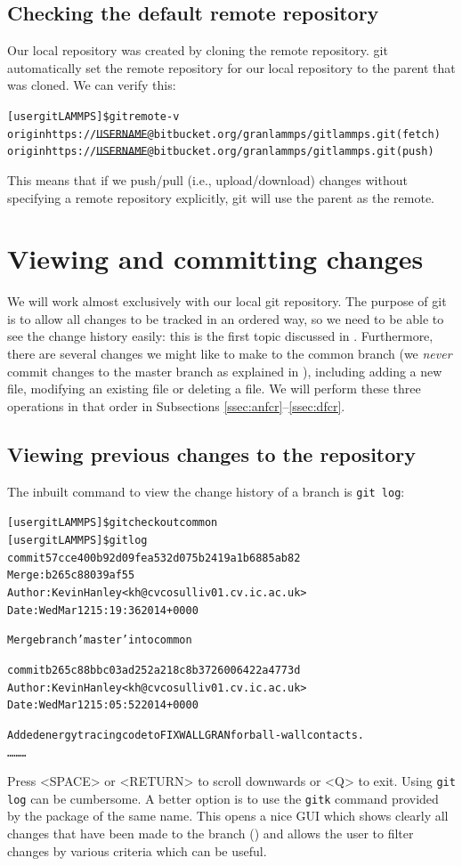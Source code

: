 \documentclass[a4paper,oneside,11pt]{article}
\begin{document}
\subsection{Checking the default remote repository}\label{ssec:cdrr}
Our local repository was created by cloning the remote repository. git automatically set the remote repository for our local repository to the parent that was cloned. We can verify this:
\begin{alltt}
[user gitLAMMPS]\$ git remote -v
origin	https://\sout{USERNAME}@bitbucket.org/granlammps/gitlammps.git (fetch)
origin	https://\sout{USERNAME}@bitbucket.org/granlammps/gitlammps.git (push)
\end{alltt}
This means that if we push\slash pull (i.e., upload\slash download) changes without specifying a remote repository explicitly, git will use the parent as the remote.

\section{Viewing and committing changes}\label{sec:vcc}
We will work almost exclusively with our local git repository. The purpose of git is to allow all changes to be tracked in an ordered way, so we need to be able to see the change history easily: this is the first topic discussed in . Furthermore, there are several changes we might like to make to the common branch (we \emph{never} commit changes to the master branch as explained in ), including adding a new file, modifying an existing file or deleting a file. We will perform these three operations in that order in Subsections \ref{ssec:anfcr}--\ref{ssec:dfcr}.

\subsection{Viewing previous changes to the repository}\label{ssec:vpcr}
The inbuilt command to view the change history of a branch is \texttt{git log}:
\begin{alltt}
[user gitLAMMPS]\$ git checkout common
[user gitLAMMPS]\$ git log
commit 57cce400b92d09fea532d075b2419a1b6885ab82
Merge: b265c88 039af55
Author: Kevin Hanley <kh@cvcosulliv01.cv.ic.ac.uk>
Date:   Wed Mar 12 15:19:36 2014 +0000

    Merge branch 'master' into common

commit b265c88bbc03ad252a218c8b3726006422a4773d
Author: Kevin Hanley <kh@cvcosulliv01.cv.ic.ac.uk>
Date:   Wed Mar 12 15:05:52 2014 +0000

    Added energy tracing code to FIX WALL GRAN for ball-wall contacts.
\ldots\hspace*{10em}\ldots\hspace*{10em}\ldots
\end{alltt}
Press <SPACE> or <RETURN> to scroll downwards or <Q> to exit. Using \texttt{git log} can be cumbersome. A better option is to use the \texttt{gitk} command provided by the package of the same name. This opens a nice GUI which shows clearly all changes that have been made to the branch () and allows the user to filter changes by various criteria which can be useful.
\end{document}
